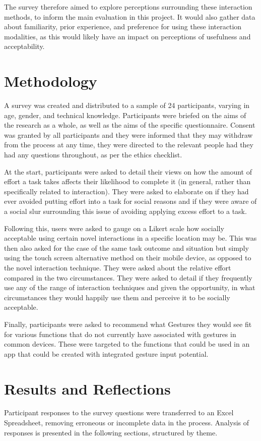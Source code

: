 \documentclass{l4proj}
\begin{document}
The survey therefore aimed to explore perceptions surrounding these interaction methods, to inform the main evaluation in this project. It would also gather data about familiarity, prior experience, and preference for using these interaction modalities, as this would likely have an impact on perceptions of usefulness and acceptability.

\section{Methodology}

A survey was created and distributed to a sample of 24 participants, varying in age, gender, and technical knowledge. Participants were briefed on the aims of the research as a whole, as well as the aims of the specific questionnaire. Consent was granted by all participants and they were informed that they may withdraw from the process at any time, they were directed to the relevant people had they had any questions throughout, as per the ethics checklist. 

At the start, participants were asked to detail their views on how the amount of effort a task takes affects their likelihood to complete it (in general, rather than specifically related to interaction). They were asked to elaborate on if they had ever avoided putting effort into a task for social reasons and if they were aware of a social slur surrounding this issue of avoiding applying excess effort to a task.

Following this, users were asked to gauge on a Likert scale how socially acceptable using certain novel interactions in a specific location may be. This was then also asked for the case of the same task outcome and situation but simply using the touch screen alternative method on their mobile device, as opposed to the novel interaction technique. They were asked about the relative effort compared in the two circumstances. They were asked to detail if they frequently use any of the range of interaction techniques and given the opportunity, in what circumstances they would happily use them and perceive it to be socially acceptable.

Finally, participants were asked to recommend what Gestures they would see fit for various functions that do not currently have associated with gestures in common devices. These were targeted to the functions that could be used in an app that could be created with integrated gesture input potential.

\section{Results and Reflections}
Participant responses to the survey questions were transferred to an Excel Spreadsheet, removing erroneous or incomplete data in the process. Analysis of responses is presented in the following sections, structured by theme.
\end{document}
